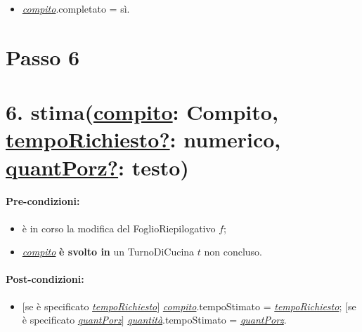 \begin{itemize}
  \item \underline{\textit{compito}}.completato = sì.
\end{itemize}

\section{Passo 6}

\section*{6. stima(\underline{compito}: Compito, \underline{tempoRichiesto?}: numerico, \underline{quantPorz?}: testo)}

\paragraph{Pre-condizioni:}

\begin{itemize}
  \item è in corso la modifica del FoglioRiepilogativo $f$;
\item \underline{\textit{compito}} \textbf{è svolto in} un TurnoDiCucina $t$ non concluso.
\end{itemize}

\paragraph{Post-condizioni:}

\begin{itemize}
  \item $[$se è specificato \underline{\textit{tempoRichiesto}}$]$ \underline{\textit{compito}}.tempoStimato = \underline{\textit{tempoRichiesto}};
  $[$se è specificato \underline{\textit{quantPorz}}$]$ \underline{\textit{quantità}}.tempoStimato = \underline{\textit{quantPorz}}.
\end{itemize}

